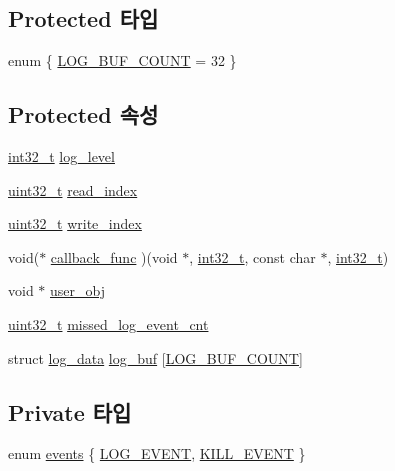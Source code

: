\subsection*{Protected 타입}
\begin{DoxyCompactItemize}
\item 
enum \{ \hyperlink{classavdecc__lib_1_1log_adf764cbdea00d65edcd07bb9953ad2b7a46b4b58fe7f3d2ff3dc4e8f781261727}{L\+O\+G\+\_\+\+B\+U\+F\+\_\+\+C\+O\+U\+NT} = 32
 \}
\end{DoxyCompactItemize}
\subsection*{Protected 속성}
\begin{DoxyCompactItemize}
\item 
\hyperlink{parse_8c_a37994e3b11c72957c6f454c6ec96d43d}{int32\+\_\+t} \hyperlink{classavdecc__lib_1_1log_aa07e39131a3e0ab9ffd691b0f455134d}{log\+\_\+level}
\item 
\hyperlink{parse_8c_a6eb1e68cc391dd753bc8ce896dbb8315}{uint32\+\_\+t} \hyperlink{classavdecc__lib_1_1log_a2ccf0f8cb3b20ac18cc9c7bcff1084ad}{read\+\_\+index}
\item 
\hyperlink{parse_8c_a6eb1e68cc391dd753bc8ce896dbb8315}{uint32\+\_\+t} \hyperlink{classavdecc__lib_1_1log_a44d246646acf5f95a78a87d606f22a42}{write\+\_\+index}
\item 
void($\ast$ \hyperlink{classavdecc__lib_1_1log_a1e4db5370768bd861a59049d170732bd}{callback\+\_\+func} )(void $\ast$, \hyperlink{parse_8c_a37994e3b11c72957c6f454c6ec96d43d}{int32\+\_\+t}, const char $\ast$, \hyperlink{parse_8c_a37994e3b11c72957c6f454c6ec96d43d}{int32\+\_\+t})
\item 
void $\ast$ \hyperlink{classavdecc__lib_1_1log_af3646c45b560aeab38e708886dec0d93}{user\+\_\+obj}
\item 
\hyperlink{parse_8c_a6eb1e68cc391dd753bc8ce896dbb8315}{uint32\+\_\+t} \hyperlink{classavdecc__lib_1_1log_a3ab71103159d076fcb40d836993a59bc}{missed\+\_\+log\+\_\+event\+\_\+cnt}
\item 
struct \hyperlink{structavdecc__lib_1_1log_1_1log__data}{log\+\_\+data} \hyperlink{classavdecc__lib_1_1log_a2a5ef536ff60c1a9a38f36c0df2f38da}{log\+\_\+buf} \mbox{[}\hyperlink{classavdecc__lib_1_1log_adf764cbdea00d65edcd07bb9953ad2b7a46b4b58fe7f3d2ff3dc4e8f781261727}{L\+O\+G\+\_\+\+B\+U\+F\+\_\+\+C\+O\+U\+NT}\mbox{]}
\end{DoxyCompactItemize}
\subsection*{Private 타입}
\begin{DoxyCompactItemize}
\item 
enum \hyperlink{classavdecc__lib_1_1log__imp_ad29858f6d8ab73f2970f41cb21a76b84}{events} \{ \hyperlink{classavdecc__lib_1_1log__imp_ad29858f6d8ab73f2970f41cb21a76b84a4bc54a84e86b0e22be8dc813e89b8d6c}{L\+O\+G\+\_\+\+E\+V\+E\+NT}, 
\hyperlink{classavdecc__lib_1_1log__imp_ad29858f6d8ab73f2970f41cb21a76b84a12fd5235623f6f4bf3b5bb5b4996b44c}{K\+I\+L\+L\+\_\+\+E\+V\+E\+NT}
 \}
\end{DoxyCompactItemize}
